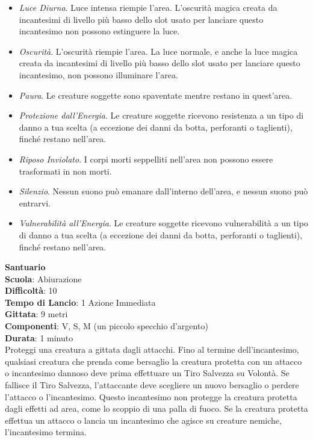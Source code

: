 \begin{multicols}{2}
\begin{itemize}
\item
\textit{Luce Diurna}. Luce intensa riempie l’area. L’oscurità magica creata da incantesimi di livello più basso dello slot usato per lanciare questo incantesimo non possono estinguere la luce.
\item
\textit{Oscurità}. L’oscurità riempie l’area. La luce normale, e anche la luce magica creata da incantesimi di livello più basso dello slot usato per lanciare questo incantesimo, non possono illuminare l’area. 
\item
\textit{Paura}. Le creature soggette sono spaventate mentre restano in quest’area.
\item
\textit{Protezione dall'Energia}. Le creature soggette ricevono resistenza a un tipo di danno a tua scelta (a eccezione dei danni da botta, perforanti o taglienti), finché restano nell'area.
\item
\textit{Riposo Inviolato}. I corpi morti seppelliti nell'area non possono essere trasformati in non morti. 
\item
\textit{Silenzio}. Nessun suono può emanare dall'interno dell'area, e nessun suono può entrarvi.
\item
\textit{Vulnerabilità all'Energia}. Le creature soggette ricevono vulnerabilità a un tipo di danno a tua scelta (a eccezione dei danni da botta, perforanti o taglienti), finché restano nell'area.
\end{itemize}

\medskip\textbf{Santuario}\\
\textbf{Scuola}: Abiurazione\\
\textbf{Difficoltà}:  10\\
\textbf{Tempo di Lancio}: 1 Azione Immediata\\
\textbf{Gittata}: 9 metri\\
\textbf{Componenti}: V, S, M (un piccolo specchio d’argento)\\
\textbf{Durata}: 1 minuto\\
Proteggi una creatura a gittata dagli attacchi. Fino al termine dell'incantesimo, qualsiasi creatura che prenda come bersaglio la creatura protetta con un attacco o incantesimo dannoso deve prima effettuare un Tiro Salvezza su Volontà. Se fallisce il Tiro Salvezza, l’attaccante deve scegliere un nuovo bersaglio o perdere l’attacco o l'incantesimo. Questo incantesimo non protegge la creatura protetta dagli effetti ad area, come lo scoppio di una palla di fuoco. Se la creatura protetta effettua un attacco o lancia un incantesimo che agisce su creature nemiche, l'incantesimo termina.


\end{multicols}
